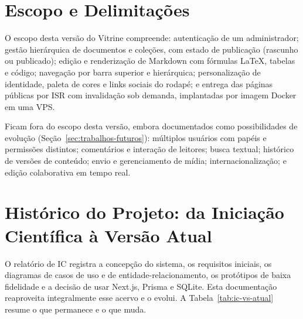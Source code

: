 \section{Escopo e Delimitações}\label{sec:escopo}

O escopo desta versão do Vitrine compreende: autenticação de um administrador; gestão hierárquica de documentos e coleções, com estado de publicação (rascunho ou publicado); edição e renderização de Markdown com fórmulas \LaTeX{}, tabelas e código; navegação por barra superior e  hierárquica; personalização de identidade, paleta de cores e links sociais do rodapé; e entrega das páginas públicas por ISR com invalidação sob demanda, implantadas por imagem Docker em uma VPS.

Ficam fora do escopo desta versão, embora documentados como possibilidades de evolução (Seção~\ref{sec:trabalhos-futuros}): múltiplos usuários com papéis e permissões distintos; comentários e interação de leitores; busca textual; histórico de versões de conteúdo; envio e gerenciamento de mídia; internacionalização; e edição colaborativa em tempo real.

\section{Histórico do Projeto: da Iniciação Científica à Versão Atual}\label{sec:historico}

O relatório de IC \cite{reis2026ic} registra a concepção do sistema, os requisitos iniciais, os diagramas de casos de uso e de entidade-relacionamento, os protótipos de baixa fidelidade e a decisão de usar Next.js, Prisma e SQLite. Esta documentação reaproveita integralmente esse acervo e o evolui. A Tabela~\ref{tab:ic-vs-atual} resume o que permanece e o que muda.

